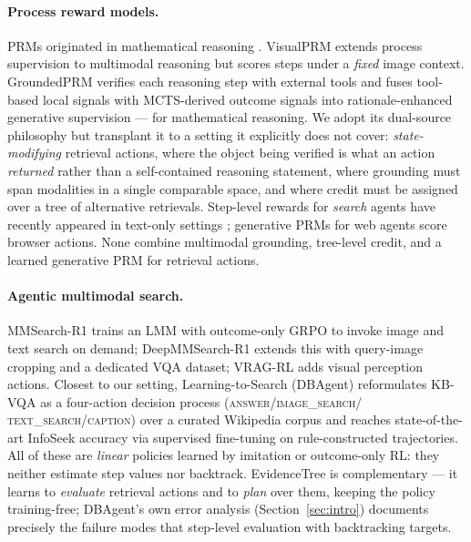 \documentclass[letterpaper,twocolumn,10pt]{article}
\newcommand{\ours}{EvidenceTree}
\begin{document}
\paragraph{Process reward models.}
PRMs originated in mathematical reasoning
\cite{lightman2023verify,wang2024mathshepherd}. VisualPRM
\cite{visualprm2025} extends process supervision to multimodal reasoning
but scores steps under a \emph{fixed} image context. GroundedPRM
\cite{groundedprm2025} verifies each reasoning step with external tools and
fuses tool-based local signals with MCTS-derived outcome signals into
rationale-enhanced generative supervision --- for mathematical reasoning.
We adopt its dual-source philosophy but transplant it to a setting it
explicitly does not cover: \emph{state-modifying} retrieval actions, where
the object being verified is what an action \emph{returned} rather than a
self-contained reasoning statement, where grounding must span modalities in
a single comparable space, and where credit must be assigned over a tree of
alternative retrievals. Step-level rewards for \emph{search} agents have
recently appeared in text-only settings
\cite{hipragr2025,ppr2026,decexrag2025}; generative PRMs for web agents
\cite{webarbiter2026} score browser actions. None combine multimodal
grounding, tree-level credit, and a learned generative PRM for retrieval
actions.

\paragraph{Agentic multimodal search.}
MMSearch-R1 \cite{wu2025mmsearchr1} trains an LMM with outcome-only GRPO to
invoke image and text search on demand; DeepMMSearch-R1
\cite{deepmmsearch2025} extends this with query-image cropping and a
dedicated VQA dataset; VRAG-RL \cite{wang2025vragrl} adds visual perception
actions. Closest to our setting, Learning-to-Search (DBAgent)
\cite{chen2026learningtosearch} reformulates KB-VQA as a four-action
decision process (\textsc{answer}/\textsc{image\_search}/%
\textsc{text\_search}/\textsc{caption}) over a curated Wikipedia corpus and
reaches state-of-the-art InfoSeek accuracy via supervised fine-tuning on
rule-constructed trajectories. All of these are \emph{linear} policies
learned by imitation or outcome-only RL: they neither estimate step values
nor backtrack. \ours{} is complementary --- it learns to \emph{evaluate}
retrieval actions and to \emph{plan} over them, keeping the policy
training-free; DBAgent's own error analysis (Section~\ref{sec:intro}) documents
precisely the failure modes that step-level evaluation with backtracking
targets.
\end{document}
